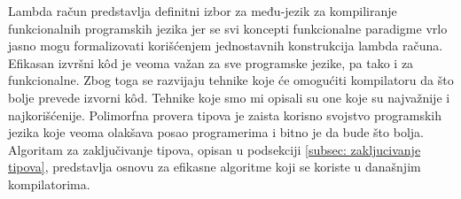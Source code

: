 \documentclass[a4paper]{article}
\begin{document}
Lambda račun predstavlja definitni izbor za među-jezik za kompiliranje funkcionalnih programskih jezika jer se svi koncepti funkcionalne paradigme vrlo jasno mogu formalizovati korišćenjem jednostavnih konstrukcija lambda računa. Efikasan izvršni k\^od je veoma važan za sve programske jezike, pa tako i za funkcionalne. Zbog toga se razvijaju tehnike koje će omogućiti kompilatoru da što bolje prevede izvorni k\^od. Tehnike koje smo mi opisali su one koje su najvažnije i najkorišćenije. Polimorfna provera tipova je zaista korisno svojstvo programskih jezika koje veoma olakšava posao programerima i bitno je da bude što bolja. Algoritam za zaključivanje tipova, opisan u podsekciji \ref{subsec: zakljucivanje tipova}, predstavlja osnovu za efikasne algoritme koji se koriste u današnjim kompilatorima.


\appendix
 


\end{document}
